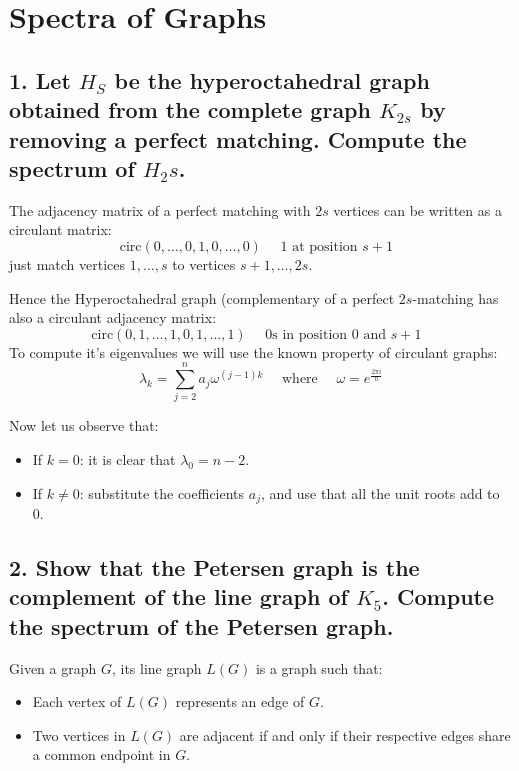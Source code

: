 \section{Spectra of Graphs}

\subsection[Spectra -1]{1. Let $H_S$ be the hyperoctahedral graph obtained from the complete graph $K_{2s}$ by removing a perfect matching. Compute the spectrum of $H_2s$.}

The adjacency matrix of a perfect matching with $2s$ vertices can be written as a circulant matrix:
$$\text{circ}(0, \dots, 0, 1, 0, \dots, 0) \quad \text{ 1 at position $s+1$ }$$
just match vertices $1, \dots, s$ to vertices $s + 1, \dots, 2s$.

Hence the Hyperoctahedral graph (complementary of a perfect $2s$-matching has also a circulant adjacency matrix:
$$\text{circ}(0, 1, \dots, 1, 0, 1, \dots, 1) \quad \text{ 0s in position $0$ and $s + 1$ }$$
To compute it's eigenvalues we will use the known property of circulant graphs:
$$\lambda_k = \sum_{j=2}^n a_j \omega^{(j - 1)k} \quad \text{ where } \quad \omega = e^{\frac{2\pi i}{n}}$$

Now let us observe that:
\begin{itemize}
    \item If $k=0$: it is clear that $\lambda_0 = n -2$.
    \item If $k \neq 0$: substitute the coefficients $a_j$, and use that all the unit roots add to 0.
\end{itemize}

\subsection[Spectra - 2]{2. Show that the Petersen graph is the complement of the line graph of $K_5$. Compute the spectrum of the Petersen graph.}

\begin{definition}
    Given a graph $G$, its line graph $L(G)$ is a graph such that:
    \begin{itemize}
        \item Each vertex of $L(G)$ represents an edge of $G$.
        \item Two vertices in $L(G)$ are adjacent if and only if their respective edges share a common endpoint in $G$.
    \end{itemize}
\end{definition}

